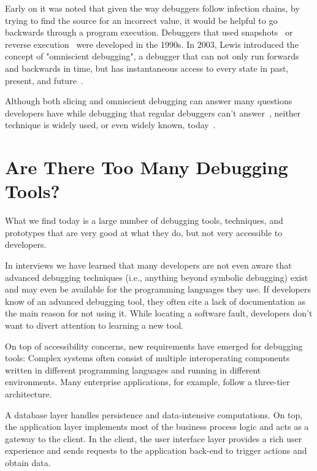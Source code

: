 Early on it was noted that given the way debuggers follow infection chains, by trying to find the source for an incorrect value, it would be helpful to go backwards through a program execution.
Debuggers that used snapshots~\cite{feldman_88_igor_a_system} or reverse execution~\cite{lieberman_95_zstep_95_a_reversible} were developed in the 1990s.
In 2003, Lewis introduced the concept of "omniscient debugging", a debugger that can not only run forwards and backwards in time, but has instantaneous access to every state in past, present, and future~\cite{lewis_03_debugging_backwards_in_time}.

Although both slicing and omniscient debugging can answer many questions developers have while debugging that regular debuggers can't answer~\cite{ko_07_information_needs_in_collocated, storey_97_how_do_program_understanding, sillito_06_questions_programmers_ask}, neither technique is widely used, or even widely known, today~\cite{perscheid_17_studying_the_advancement}.

\section{Are There Too Many Debugging Tools?}

What we find today is a large number of debugging tools, techniques, and prototypes that are very good at what they do, but not very accessible to developers.

In interviews we have learned that many developers are not even aware that advanced debugging techniques (i.e., anything beyond symbolic debugging) exist and may even be available for the programming languages they use.
If developers know of an advanced debugging tool, they often cite a lack of documentation as the main reason for not using it.
While locating a software fault, developers don't want to divert attention to learning a new tool.


On top of accessibility concerns, new requirements have emerged for debugging tools:
Complex systems often consist of multiple interoperating components written in different programming languages and running in different environments.
Many enterprise applications, for example, follow a three-tier architecture.

A database layer handles persistence and data-intensive computations.
On top, the application layer implements most of the business process logic and acts as a gateway to the client.
In the client, the user interface layer provides a rich user experience and sends requests to the application back-end to trigger actions and obtain data.

